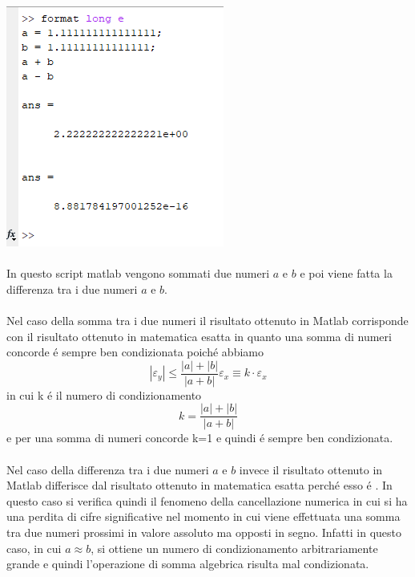 \includegraphics[width=.65\linewidth]{img/ex4}\\~\\
In questo script matlab vengono sommati due numeri $a$ e $b$ e poi viene fatta la differenza tra i due numeri $a$ e $b$.\\~\\
Nel caso della somma tra i due numeri il risultato ottenuto in Matlab corrisponde con il risultato ottenuto in matematica esatta in quanto una somma di numeri concorde \'e sempre ben condizionata poich\'e abbiamo
\begin{equation}
	\left | \varepsilon_{y}  \right | \leq \frac{\left | a \right | + \left | b \right |}{\left | a + b \right |} \varepsilon_{x} \equiv k \cdot \varepsilon_{x}
\end{equation}
in cui k \'e il numero di condizionamento
\begin{equation}
k =  \frac{\left | a \right | + \left | b \right |}{\left | a + b \right |}
\end{equation}
e per una somma di numeri concorde k=1 e quindi \'e sempre ben condizionata.
\\~\\
Nel caso della differenza tra i due numeri $a$ e $b$ invece il risultato ottenuto in Matlab differisce dal risultato ottenuto in matematica esatta perch\'e esso \'e  . In questo caso si verifica quindi il fenomeno della cancellazione numerica in cui si ha una perdita di cifre significative nel momento in cui viene effettuata una somma tra due numeri prossimi in valore assoluto ma opposti in segno. Infatti in questo caso, in cui $a \approx b$, si ottiene un numero di condizionamento arbitrariamente grande e quindi l'operazione di somma algebrica risulta mal condizionata.
